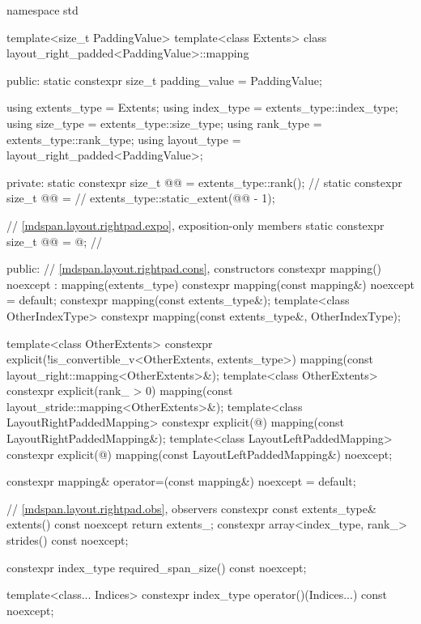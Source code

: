 \begin{codeblock}
namespace std {
  template<size_t PaddingValue>
  template<class Extents>
  class layout_right_padded<PaddingValue>::mapping {
  public:
    static constexpr size_t padding_value = PaddingValue;

    using extents_type = Extents;
    using index_type = extents_type::index_type;
    using size_type = extents_type::size_type;
    using rank_type = extents_type::rank_type;
    using layout_type = layout_right_padded<PaddingValue>;

  private:
    static constexpr size_t @@ = extents_type::rank();    // \expos
    static constexpr size_t @@ =             // \expos
      extents_type::static_extent(@@ - 1);

    // \ref{mdspan.layout.rightpad.expo}, exposition-only members
    static constexpr size_t @@ = @\seebelow@; // \expos

  public:
    // \ref{mdspan.layout.rightpad.cons}, constructors
    constexpr mapping() noexcept : mapping(extents_type{}) {}
    constexpr mapping(const mapping&) noexcept = default;
    constexpr mapping(const extents_type&);
    template<class OtherIndexType>
      constexpr mapping(const extents_type&, OtherIndexType);

    template<class OtherExtents>
      constexpr explicit(!is_convertible_v<OtherExtents, extents_type>)
        mapping(const layout_right::mapping<OtherExtents>&);
    template<class OtherExtents>
      constexpr explicit(rank_ > 0)
        mapping(const layout_stride::mapping<OtherExtents>&);
    template<class LayoutRightPaddedMapping>
      constexpr explicit(@\seebelow@)
        mapping(const LayoutRightPaddedMapping&);
    template<class LayoutLeftPaddedMapping>
      constexpr explicit(@\seebelow@)
        mapping(const LayoutLeftPaddedMapping&) noexcept;

    constexpr mapping& operator=(const mapping&) noexcept = default;

    // \ref{mdspan.layout.rightpad.obs}, observers
    constexpr const extents_type& extents() const noexcept { return extents_; }
    constexpr array<index_type, rank_> strides() const noexcept;

    constexpr index_type required_span_size() const noexcept;

    template<class... Indices>
      constexpr index_type operator()(Indices...) const noexcept;

}}
\end{codeblock}
